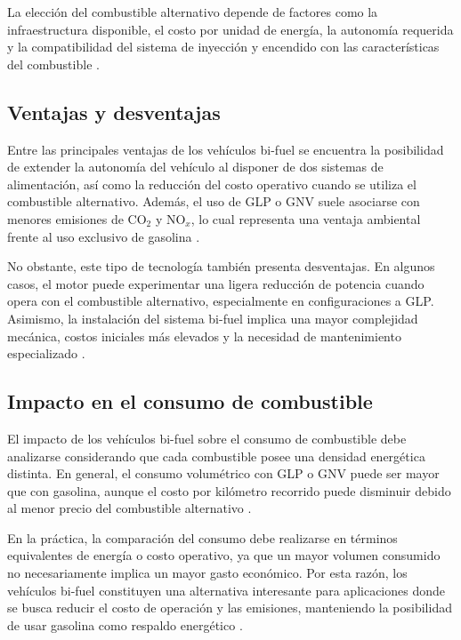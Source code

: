 La elección del combustible alternativo depende de factores como la infraestructura disponible, el costo por unidad de energía, la autonomía requerida y la compatibilidad del sistema de inyección y encendido con las características del combustible \citep{GasNaturalGNU, BifuelMotor1}.

\subsection{Ventajas y desventajas}

Entre las principales ventajas de los vehículos bi-fuel se encuentra la posibilidad de extender la autonomía del vehículo al disponer de dos sistemas de alimentación, así como la reducción del costo operativo cuando se utiliza el combustible alternativo. Además, el uso de GLP o GNV suele asociarse con menores emisiones de CO$_2$ y NO$_x$, lo cual representa una ventaja ambiental frente al uso exclusivo de gasolina \citep{ GasNaturalGNU, Fedebiocombustibles}.

No obstante, este tipo de tecnología también presenta desventajas. En algunos casos, el motor puede experimentar una ligera reducción de potencia cuando opera con el combustible alternativo, especialmente en configuraciones a GLP. Asimismo, la instalación del sistema bi-fuel implica una mayor complejidad mecánica, costos iniciales más elevados y la necesidad de mantenimiento especializado \citep{ BifuelMotorES}.

\subsection{Impacto en el consumo de combustible}

El impacto de los vehículos bi-fuel sobre el consumo de combustible debe analizarse considerando que cada combustible posee una densidad energética distinta. En general, el consumo volumétrico con GLP o GNV puede ser mayor que con gasolina, aunque el costo por kilómetro recorrido puede disminuir debido al menor precio del combustible alternativo \citep{DRBifuel}.

En la práctica, la comparación del consumo debe realizarse en términos equivalentes de energía o costo operativo, ya que un mayor volumen consumido no necesariamente implica un mayor gasto económico. Por esta razón, los vehículos bi-fuel constituyen una alternativa interesante para aplicaciones donde se busca reducir el costo de operación y las emisiones, manteniendo la posibilidad de usar gasolina como respaldo energético \citep{GasNaturalGNU, BifuelMotorES}.

